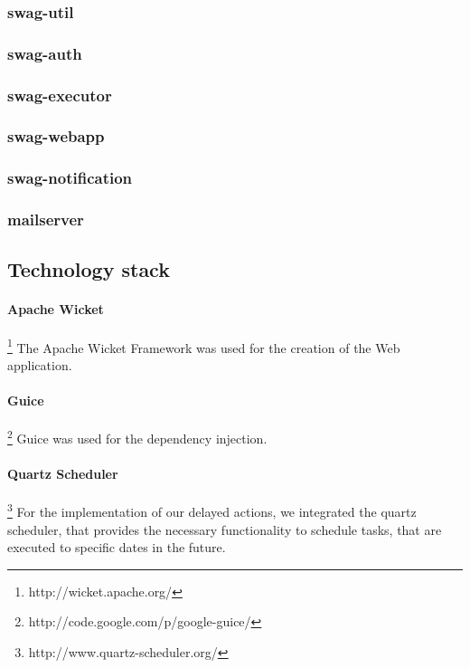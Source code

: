 \documentclass[a4paper]{article}
\begin{document}
\subsubsection{swag-util}

\subsubsection{swag-auth}

\subsubsection{swag-executor}

\subsubsection{swag-webapp}

\subsubsection{swag-notification}

\subsubsection{mailserver}


\subsection{Technology stack}
\paragraph{Apache Wicket}\footnote{http://wicket.apache.org/}
The Apache Wicket Framework was used for the creation of the Web application.

\paragraph{Guice}\footnote{http://code.google.com/p/google-guice/}
Guice was used for the dependency injection.

\paragraph{Quartz Scheduler} \footnote{http://www.quartz-scheduler.org/}
For the implementation of our delayed actions, we integrated the quartz scheduler, that provides the necessary functionality to schedule tasks, that are executed to specific dates in the future.
\end{document}

